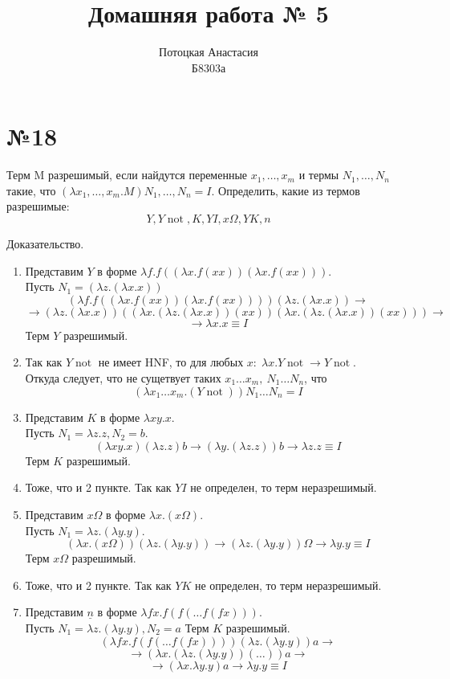 \documentclass[a4paper,14pt]{scrreprt}
\title{Домашняя работа № 5}
\author{Потоцкая Анастасия\\Б8303а}
\newcommand{\lmd}{\lambda}
\newcommand{\un}[1]{\underline{#1}}
\DeclareMathOperator{\mnot}{not}
\begin{document}
\maketitle
\section*{№18}
Терм M разрешимый, если найдутся переменные $ x_1, \dots, x_m$ и  термы $N_1,\dots, N_n$ такие, что $(\lambda x_1, \dots,x_m. M) N_1,\dots, N_n = I$. 
Определить, какие из термов разрешимые: 
$$ Y, Y \mnot, K, YI, x\Omega, YK, n$$

Доказательство.
\begin{enumerate}
	\item Представим $Y$ в форме $\lmd f.f((\lmd x.f(xx))(\lmd x.f(xx)))$. \\
		  Пусть $ N_1 = (\lmd z.(\lmd x.x))$
	$$(\lmd f.f((\lmd x.f(xx))(\lmd x.f(xx)))) (\lmd z.(\lmd x.x)) \to $$
	$$ \to (\lmd z.(\lmd x.x)) ( (\lmd x.(\lmd z.(\lmd x.x))(xx)) (\lmd x.(\lmd z.(\lmd x.x))(xx)) )  \to $$
	$$ \to \lmd x.x \equiv I $$	
	Терм  $Y$ разрешимый.
	
	\item Так как $Y \mnot $ не имеет HNF, то для любых $x:\; \lmd x.Y \mnot \to Y \mnot$. \\
	Откуда следует, что не сущетвует таких $x_1\dots x_m,\ N_1\dots N_n$,	что 
	$$(\lmd x_1\dots x_m.(Y \mnot))N_1\dots N_n=I$$

	\item Представим $K$ в форме $\lmd xy.x$. \\ 
		Пусть $ N_1 = \lmd z.z, N_2 = b$.
	$$ (\lmd xy.x)(\lmd z.z)b \to (\lmd y.(\lmd z.z))b \to \lmd z.z \equiv I$$
	Терм  $K$ разрешимый.

	\item Тоже, что и 2 пункте. Так как $YI$ не определен, то терм неразрешимый.
	
	\item Представим $x\Omega $ в форме $ \lmd x.(x \Omega) $. \\ 
		Пусть $ N_1 = \lmd z.(\lmd y.y)$.
	$$ (\lmd x.(x \Omega))(\lmd z.(\lmd y.y)) \to (\lmd z.(\lmd y.y))\Omega \to \lmd y.y \equiv I$$
	Терм  $x\Omega $ разрешимый.
	
	\item Тоже, что и 2 пункте. Так как $YK$  не определен, то терм неразрешимый. 
	
	\item Представим $\un{n}$ в форме $ \lmd fx.f(f(\dots f(fx))) $. \\ 
		Пусть $ N_1 = \lmd z.(\lmd y.y), N_2 = a$	Терм  $K$ разрешимый.
	$$ (\lmd fx.f(f(\dots f(fx))))(\lmd z.(\lmd y.y))a \to $$
	$$ \to (\lmd x.(\lmd z.(\lmd y.y))(\dots))a \to $$
	$$ \to (\lmd x.\lmd y.y)a \to \lmd y.y \equiv I $$

\end{enumerate}
\end{document}
